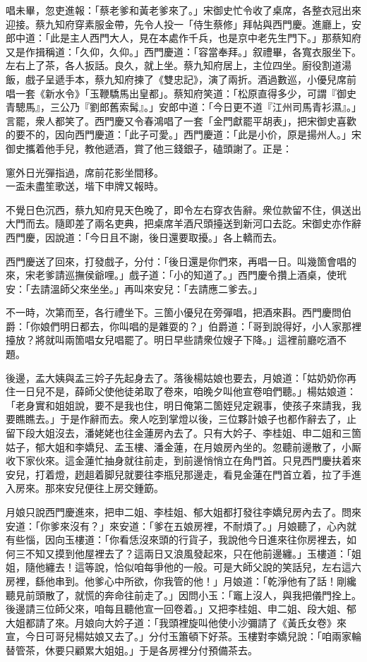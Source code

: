 唱未畢，忽吏進報：「蔡老爹和黃老爹來了。」宋御史忙令收了桌席，各整衣冠出來迎接。蔡九知府穿素服金帶，先令人投一「侍生蔡修」拜帖與西門慶。進廳上，安郎中道：「此是主人西門大人，見在本處作千兵，也是京中老先生門下。」那蔡知府又是作揖稱道：「久仰，久仰。」西門慶道：「容當奉拜。」叙禮畢，各寬衣服坐下。左右上了茶，各人扳話。良久，就上坐。蔡九知府居上，主位四坐。廚役割道湯飯，戲子呈遞手本，蔡九知府揀了《雙忠記》，{}演了兩折。酒過數巡，小優兒席前唱一套《新水令》「玉鞭驕馬出皇都」。蔡知府笑道：「松原直得多少，可謂『御史青驄馬』，三公乃『劉郎舊索髯』。」安郎中道：「今日更不道『江州司馬青衫濕』。」言罷，衆人都笑了。{}西門慶又令春鴻唱了一套「金門獻罷平胡表」，把宋御史喜歡的要不的，因向西門慶道：「此子可愛。」西門慶道：「此是小价，原是揚州人。」宋御史攜着他手兒，教他遞酒，賞了他三錢銀子，磕頭謝了。正是：

\begin{myquote}
窻外日光彈指過，席前花影坐間移。\\一盃未盡笙歌送，堦下申牌又報時。
\end{myquote}

不覺日色沉西，蔡九知府見天色晚了，即令左右穿衣告辭。衆位款留不住，俱送出大門而去。隨即差了兩名吏典，把桌席羊酒尺頭擡送到新河口去訖。宋御史亦作辭西門慶，因說道：「今日且不謝，後日還要取擾。」各上轎而去。

西門慶送了回來，打發戲子，分付：「後日還是你們來，再唱一日。叫幾箇會唱的來，宋老爹請巡撫侯爺哩。」戲子道：「小的知道了。」西門慶令攢上酒桌，使玳安：「去請溫師父來坐坐。」再叫來安兒：「去請應二爹去。」

不一時，次第而至，各行禮坐下。三箇小優兒在旁彈唱，把酒來斟。西門慶問伯爵：「你娘們明日都去，你叫唱的是雜耍的？」伯爵道：「哥到說得好，小人家那裡擡放？將就叫兩箇唱女兒唱罷了。明日早些請衆位嫂子下降。」這裡前廳吃酒不題。

後邊，孟大姨與孟三妗子先起身去了。落後楊姑娘也要去，月娘道：「姑奶奶你再住一日兒不是，薛師父使他徒弟取了卷來，咱晚夕叫他宣卷咱們聽。」楊姑娘道：「老身實和姐姐說，要不是我也住，明日俺第二箇姪兒定親事，使孩子來請我，我要瞧瞧去。」于是作辭而去。衆人吃到掌燈以後，三位夥計娘子也都作辭去了，止留下段大姐沒去，潘姥姥也往金蓮房內去了。只有大妗子、李桂姐、申二姐和三箇姑子，郁大姐和李嬌兒、孟玉樓、潘金蓮，在月娘房內坐的。忽聽前邊散了，小厮收下家伙來。這金蓮忙抽身就往前走，到前邊悄悄立在角門首。只見西門慶扶着來安兒，打着燈，趔趄着脚兒就要往李瓶兒那邊走，看見金蓮在門首立着，拉了手進入房來。那來安兒便往上房交鍾筯。

月娘只說西門慶進來，把申二姐、李桂姐、郁大姐都打發往李嬌兒房內去了。問來安道：「你爹來沒有？」來安道：「爹在五娘房裡，不耐煩了。」月娘聽了，心內就有些惱，{}因向玉樓道：「你看恁沒來頭的行貨子，我說他今日進來往你房裡去，如何三不知又摸到他屋裡去了？這兩日又浪風發起來，只在他前邊纏。」玉樓道：「姐姐，隨他纏去！這等說，恰似咱每爭他的一般。可是大師父說的笑話兒，左右這六房裡，繇他串到。他爹心中所欲，你我管的他！」月娘道：「乾淨他有了話！剛纔聽見前頭散了，就慌的奔命往前走了。」因問小玉：「竈上沒人，與我把儀門拴上。後邊請三位師父來，咱每且聽他宣一回卷着。」又把李桂姐、申二姐、段大姐、郁大姐都請了來。月娘向大妗子道：「我頭裡旋叫他使小沙彌請了《黃氏女卷》來宣，今日可哥兒楊姑娘又去了。」分付玉簫頓下好茶。玉樓對李嬌兒說：「咱兩家輪替管茶，休要只顧累大姐姐。」于是各房裡分付預備茶去。

